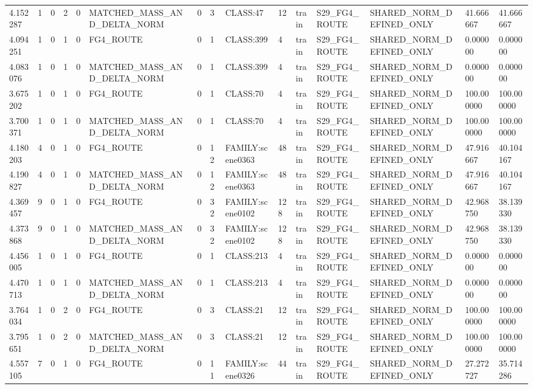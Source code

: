 \begin{tabular}{lllllllllllllll}
4.152287 & 1 & 0 & 2 & 0 & MATCHED\_MASS\_AND\_DELTA\_NORM & 0 & 3 & CLASS:47 & 12 & train & S29\_FG4\_ROUTE & SHARED\_NORM\_DEFINED\_ONLY & 41.666667 & 41.666667 \\
4.094251 & 1 & 0 & 1 & 0 & FG4\_ROUTE & 0 & 1 & CLASS:399 & 4 & train & S29\_FG4\_ROUTE & SHARED\_NORM\_DEFINED\_ONLY & 0.000000 & 0.000000 \\
4.083076 & 1 & 0 & 1 & 0 & MATCHED\_MASS\_AND\_DELTA\_NORM & 0 & 1 & CLASS:399 & 4 & train & S29\_FG4\_ROUTE & SHARED\_NORM\_DEFINED\_ONLY & 0.000000 & 0.000000 \\
3.675202 & 1 & 0 & 1 & 0 & FG4\_ROUTE & 0 & 1 & CLASS:70 & 4 & train & S29\_FG4\_ROUTE & SHARED\_NORM\_DEFINED\_ONLY & 100.000000 & 100.000000 \\
3.700371 & 1 & 0 & 1 & 0 & MATCHED\_MASS\_AND\_DELTA\_NORM & 0 & 1 & CLASS:70 & 4 & train & S29\_FG4\_ROUTE & SHARED\_NORM\_DEFINED\_ONLY & 100.000000 & 100.000000 \\
4.180203 & 4 & 0 & 1 & 0 & FG4\_ROUTE & 0 & 12 & FAMILY:scene0363 & 48 & train & S29\_FG4\_ROUTE & SHARED\_NORM\_DEFINED\_ONLY & 47.916667 & 40.104167 \\
4.190827 & 4 & 0 & 1 & 0 & MATCHED\_MASS\_AND\_DELTA\_NORM & 0 & 12 & FAMILY:scene0363 & 48 & train & S29\_FG4\_ROUTE & SHARED\_NORM\_DEFINED\_ONLY & 47.916667 & 40.104167 \\
4.369457 & 9 & 0 & 1 & 0 & FG4\_ROUTE & 0 & 32 & FAMILY:scene0102 & 128 & train & S29\_FG4\_ROUTE & SHARED\_NORM\_DEFINED\_ONLY & 42.968750 & 38.139330 \\
4.373868 & 9 & 0 & 1 & 0 & MATCHED\_MASS\_AND\_DELTA\_NORM & 0 & 32 & FAMILY:scene0102 & 128 & train & S29\_FG4\_ROUTE & SHARED\_NORM\_DEFINED\_ONLY & 42.968750 & 38.139330 \\
4.456005 & 1 & 0 & 1 & 0 & FG4\_ROUTE & 0 & 1 & CLASS:213 & 4 & train & S29\_FG4\_ROUTE & SHARED\_NORM\_DEFINED\_ONLY & 0.000000 & 0.000000 \\
4.470713 & 1 & 0 & 1 & 0 & MATCHED\_MASS\_AND\_DELTA\_NORM & 0 & 1 & CLASS:213 & 4 & train & S29\_FG4\_ROUTE & SHARED\_NORM\_DEFINED\_ONLY & 0.000000 & 0.000000 \\
3.764034 & 1 & 0 & 2 & 0 & FG4\_ROUTE & 0 & 3 & CLASS:21 & 12 & train & S29\_FG4\_ROUTE & SHARED\_NORM\_DEFINED\_ONLY & 100.000000 & 100.000000 \\
3.795651 & 1 & 0 & 2 & 0 & MATCHED\_MASS\_AND\_DELTA\_NORM & 0 & 3 & CLASS:21 & 12 & train & S29\_FG4\_ROUTE & SHARED\_NORM\_DEFINED\_ONLY & 100.000000 & 100.000000 \\
4.557105 & 7 & 0 & 1 & 0 & FG4\_ROUTE & 0 & 11 & FAMILY:scene0326 & 44 & train & S29\_FG4\_ROUTE & SHARED\_NORM\_DEFINED\_ONLY & 27.272727 & 35.714286 \\

\end{tabular}
